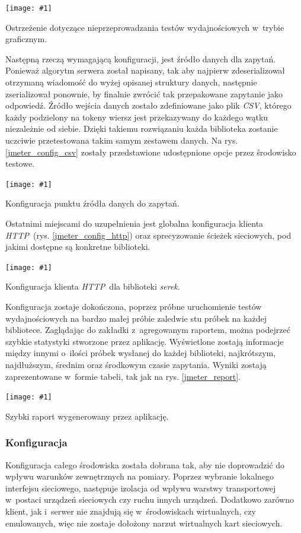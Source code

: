 \documentclass[12pt]{article}
\newcommand{\n}{\newline}
\newcommand{\putss}[3]{
\begin{captioned}[H]
	\centering
	\texttt{[image: \#1]}
	\caption{#2}
	\label{#3}
	\medskip
\end{captioned}
}
\newcommand{\nonpl}[1]{{\it #1}}
\newcommand{\HTTP}{\nonpl{HTTP}}
\newcommand{\serek}{\nonpl{serek}}
\begin{document}
{{{				\putss{./img/jmeter_ss/jmeter_gui_warn.png}{ Ostrzeżenie dotyczące nieprzeprowadzania testów wydajnościowych w~trybie graficznym.}{jmeter_warn}

				\newpage

				Następną rzeczą wymagającą konfiguracji, jest źródło danych dla zapytań. Ponieważ algorytm serwera został napisany, tak aby najpierw zdeserializował otrzymaną
				wiadomość do wyżej opisanej struktury danych, następnie zserializował ponownie, by finalnie zwrócić tak przepakowane zapytanie jako odpowiedź. Źródło wejścia danych
				zostało zdefiniowane jako plik \nonpl{CSV}, którego każdy podzielony na tokeny wiersz jest przekazywany do każdego wątku niezależnie od siebie. Dzięki takiemu rozwiązaniu
				każda biblioteka zostanie uczciwie przetestowana takim samym zestawem danych. Na rys. \ref{jmeter_config_csv} zostały przedstawione udostępnione opcje przez środowisko testowe.\n

				\putss{./img/jmeter_ss/csv_config.png}{ Konfiguracja punktu źródła danych do zapytań.}{jmeter_config_csv}

				Ostatnimi miejscami do uzupełnienia jest globalna konfiguracja klienta \HTTP~(rys. \ref{jmeter_config_http}) oraz sprecyzowanie ścieżek sieciowych, pod jakimi dostępne są konkretne biblioteki.\n

				\putss{./img/jmeter_ss/http_serek_config.png}{ Konfiguracja klienta \HTTP~dla biblioteki \serek.}{jmeter_config_http}

				Konfiguracja zostaje dokończona, poprzez próbne uruchomienie testów wydajnościowych na bardzo małej próbie zaledwie stu próbek
				na każdej bibliotece. Zaglądając do zakładki z~agregowanym raportem, można podejrzeć szybkie statystyki stworzone przez aplikację. Wyświetlone
				zostają informacje między innymi o~ilości próbek wysłanej do każdej biblioteki, najkrótszym, najdłuższym, średnim oraz środkowym czasie zapytania. Wyniki
				zostają zaprezentowane w~formie tabeli, tak jak na rys. \ref{jmeter_report}.\n

				\putss{./img/jmeter_ss/aggregate_report.png}{ Szybki raport wygenerowany przez aplikację.}{jmeter_report}
			}

			{
				\subsubsection{Konfiguracja}

				Konfiguracja całego środowiska została dobrana tak, aby nie doprowadzić do wpływu warunków zewnętrznych na pomiary. Poprzez
				wybranie lokalnego interfejsu sieciowego, następuje izolacja od wpływu warstwy transportowej w~postaci urządzeń sieciowych czy ruchu innych urządzeń.
				Dodatkowo zarówno klient, jak i~serwer nie znajdują się w~środowiskach wirtualnych, czy emulowanych, więc nie zostaje dołożony narzut wirtualnych kart sieciowych.\n

}}}
\end{document}
